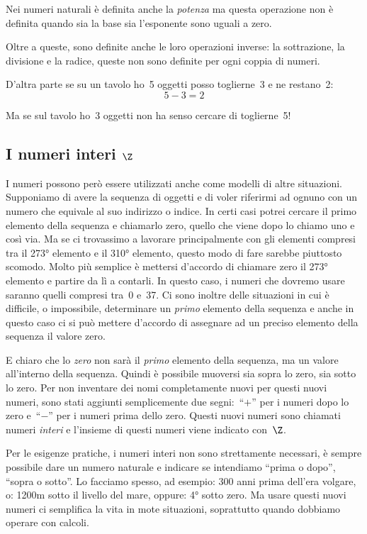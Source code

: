 Nei numeri naturali è definita anche la \emph{potenza} ma questa operazione 
non è definita quando sia la base sia l'esponente sono uguali a zero.

Oltre a queste, sono definite anche le loro operazioni inverse: la 
sottrazione, la divisione e la radice, queste non sono definite per ogni 
coppia di numeri.

D'altra parte se su un tavolo ho~5 oggetti posso toglierne~3 e ne restano~2:
\[5-3=2\]

Ma se sul tavolo ho~3 oggetti non ha senso cercare di toglierne~5!

\subsection{I numeri interi \(\Z\)}
\label{subsec:insnum_interi}

I numeri possono però essere utilizzati anche come modelli di altre 
situazioni. 
Supponiamo di avere la sequenza di oggetti e di voler riferirmi ad ognuno 
con un numero che equivale al suo indirizzo o indice. In certi casi potrei 
cercare il primo elemento della sequenza e chiamarlo zero, quello che viene 
dopo lo chiamo uno e così via. Ma se ci trovassimo a lavorare principalmente 
con gli elementi compresi tra il 273° elemento e il 310° elemento, questo 
modo di fare sarebbe piuttosto scomodo. 
Molto più semplice è mettersi d'accordo di chiamare zero il 273° elemento e 
partire da lì a contarli. In questo caso, i numeri che dovremo usare saranno 
quelli compresi tra~0 e~37. 
Ci sono inoltre delle situazioni in cui è difficile, o impossibile, 
determinare un \emph{primo} elemento della sequenza e anche in questo caso 
ci si può mettere d'accordo di assegnare ad un preciso elemento della 
sequenza il valore zero.

E chiaro che lo \emph{zero} non sarà il \emph{primo} elemento della 
sequenza, ma un valore all'interno della sequenza. Quindi è possibile 
muoversi sia sopra lo zero, sia sotto lo zero.
Per non inventare dei nomi completamente nuovi per questi nuovi 
numeri, sono stati aggiunti semplicemente due segni:~``\(+\)'' per i numeri 
dopo lo zero e~``\(-\)'' per i numeri prima dello zero. 
Questi nuovi numeri sono chiamati numeri \emph{interi} 
e l'insieme di questi numeri viene indicato con~\(\Z\).

Per le esigenze pratiche, i numeri interi non sono strettamente necessari, è 
sempre possibile dare un numero naturale e indicare se intendiamo ``prima o 
dopo'', ``sopra o sotto''. Lo facciamo spesso, ad esempio: 300 anni prima 
dell'era volgare, o: 1200m sotto il livello del mare, oppure: 4° sotto zero. 
Ma usare questi nuovi numeri ci semplifica la vita in mote situazioni, 
soprattutto quando dobbiamo operare con calcoli.

